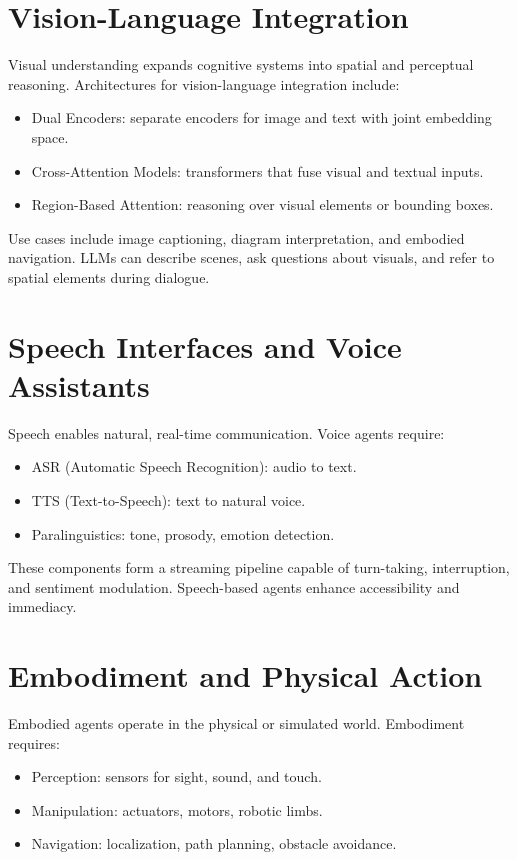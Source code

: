 \documentclass{book}
\begin{document}
\section{Vision-Language Integration}

Visual understanding expands cognitive systems into spatial and perceptual reasoning. Architectures for vision-language integration include:

\begin{itemize}
  \item Dual Encoders: separate encoders for image and text with joint embedding space.
  \item Cross-Attention Models: transformers that fuse visual and textual inputs.
  \item Region-Based Attention: reasoning over visual elements or bounding boxes.
\end{itemize}

Use cases include image captioning, diagram interpretation, and embodied navigation. LLMs can describe scenes, ask questions about visuals, and refer to spatial elements during dialogue.

\section{Speech Interfaces and Voice Assistants}

Speech enables natural, real-time communication. Voice agents require:

\begin{itemize}
  \item ASR (Automatic Speech Recognition): audio to text.
  \item TTS (Text-to-Speech): text to natural voice.
  \item Paralinguistics: tone, prosody, emotion detection.
\end{itemize}

These components form a streaming pipeline capable of turn-taking, interruption, and sentiment modulation. Speech-based agents enhance accessibility and immediacy.

\section{Embodiment and Physical Action}

Embodied agents operate in the physical or simulated world. Embodiment requires:

\begin{itemize}
  \item Perception: sensors for sight, sound, and touch.
  \item Manipulation: actuators, motors, robotic limbs.
  \item Navigation: localization, path planning, obstacle avoidance.
\end{itemize}
\end{document}
